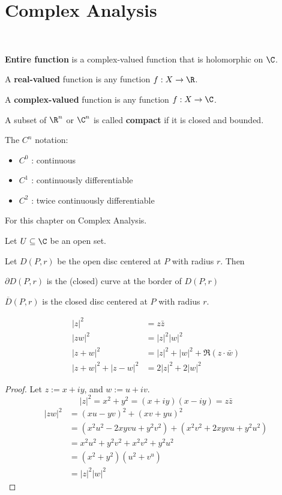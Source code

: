 \section{Complex Analysis}\label{f28d4dc}

\label{d508dc8}

\textcolor{white}{.}

\textbf{Entire function} is a complex-valued function that is holomorphic on
$\C$.

A \textbf{real-valued} function is any function $f:X\to\R$.

A \textbf{complex-valued} function is any function $f:X\to\C$.

A subset of $\R^n$ or $\C^n$ is called \textbf{compact} if it is closed and
bounded.

The $C^n$ notation:
\begin{itemize}
  \item $C^0$ : continuous
  \item $C^1$ : continuously differentiable
  \item $C^2$ : twice continuously differentiable
\end{itemize}

\label{d1055b9}

For this chapter on Complex Analysis.

Let $U\subseteq\C$ be an open set.

Let $D(P,r)$ be the open disc centered at $P$ with radius $r$. Then
\begin{enumerati}
  \item $\partial D(P,r)$ is the (closed) curve at the border of $D(P,r)$
  \item $\overline D(P,r)$ is the closed disc centered at $P$ with
  radius $r$.
\end{enumerati}

\label{adebe9e}

\begin{align*}
  |z|^2           &=z\bar z                       \\
  |zw|^2          &=|z|^2|w|^2                    \\
  |z+w|^2         &=|z|^2+|w|^2+\Re(z\cdot\bar w) \\
  |z+w|^2+|z-w|^2 &=2|z|^2+2|w|^2
\end{align*}

\begin{proof}
  Let $z:=x+iy$, and $w:=u+iv$.
  $$
    |z|^2=x^2+y^2=(x+iy)(x-iy)=z\bar z
  $$
  \begin{align*}
    |zw|^2
     &= (xu-yv)^2+(xv+yu)^2                        \\
     &=(x^2u^2-2xyvu+y^2v^2)+(x^2v^2+2xyvu+y^2u^2) \\
     &=x^2u^2+y^2v^2+x^2v^2+y^2u^2                 \\
     &=(x^2+y^2)(u^2+v^u)                          \\
     &=|z|^2|w|^2
  \end{align*}
\end{proof}

